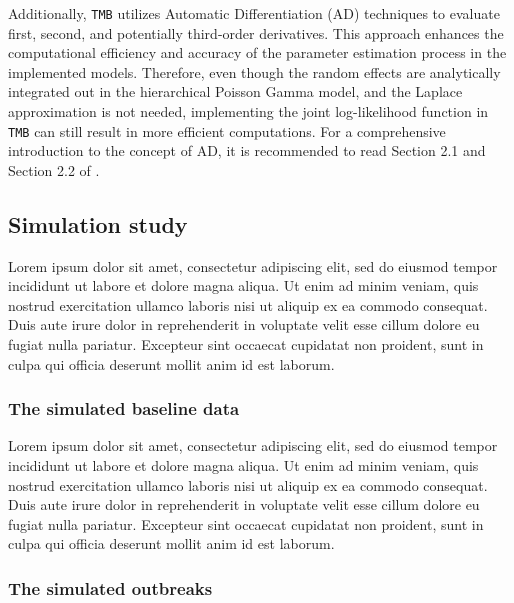 \documentclass[preprint, 3p,
authoryear]{elsarticle} %
\begin{document}
Additionally, \texttt{TMB} utilizes Automatic Differentiation (AD)
techniques \citep{Griewank_2008} to evaluate first, second, and
potentially third-order derivatives. This approach enhances the
computational efficiency and accuracy of the parameter estimation
process in the implemented models. Therefore, even though the random
effects are analytically integrated out in the hierarchical Poisson
Gamma model, and the Laplace approximation is not needed, implementing
the joint log-likelihood function in \texttt{TMB} can still result in
more efficient computations. For a comprehensive introduction to the
concept of AD, it is recommended to read Section 2.1 and Section 2.2 of
\citet{Fournier_2012}.

\hypertarget{simulation-study}{%
\subsection{Simulation study}\label{simulation-study}}

Lorem ipsum dolor sit amet, consectetur adipiscing elit, sed do eiusmod
tempor incididunt ut labore et dolore magna aliqua. Ut enim ad minim
veniam, quis nostrud exercitation ullamco laboris nisi ut aliquip ex ea
commodo consequat. Duis aute irure dolor in reprehenderit in voluptate
velit esse cillum dolore eu fugiat nulla pariatur. Excepteur sint
occaecat cupidatat non proident, sunt in culpa qui officia deserunt
mollit anim id est laborum.

\hypertarget{the-simulated-baseline-data}{%
\subsubsection{The simulated baseline
data}\label{the-simulated-baseline-data}}

Lorem ipsum dolor sit amet, consectetur adipiscing elit, sed do eiusmod
tempor incididunt ut labore et dolore magna aliqua. Ut enim ad minim
veniam, quis nostrud exercitation ullamco laboris nisi ut aliquip ex ea
commodo consequat. Duis aute irure dolor in reprehenderit in voluptate
velit esse cillum dolore eu fugiat nulla pariatur. Excepteur sint
occaecat cupidatat non proident, sunt in culpa qui officia deserunt
mollit anim id est laborum.

\hypertarget{the-simulated-outbreaks}{%
\subsubsection{The simulated outbreaks}\label{the-simulated-outbreaks}}
\end{document}
